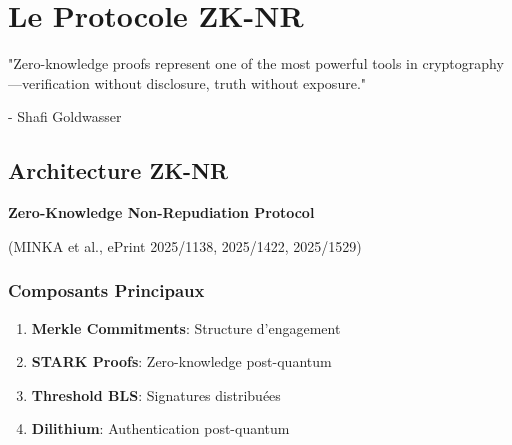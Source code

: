 \chapter{Le Protocole ZK-NR}
\epigraph{"Zero-knowledge proofs represent one of the most powerful tools in cryptography—verification without disclosure, truth without exposure."}{- Shafi Goldwasser}
\section{Architecture ZK-NR}
\textbf{Zero-Knowledge Non-Repudiation Protocol}

(MINKA et al., ePrint 2025/1138, 2025/1422, 2025/1529)

\subsection{Composants Principaux}
\begin{enumerate}
\item \textbf{Merkle Commitments}: Structure d'engagement
\item \textbf{STARK Proofs}: Zero-knowledge post-quantum
\item \textbf{Threshold BLS}: Signatures distribuées
\item \textbf{Dilithium}: Authentication post-quantum
\end{enumerate}

